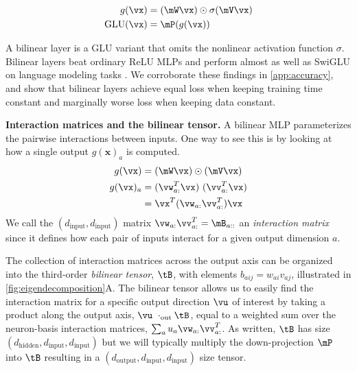 \documentclass{article} %
\begin{document}
\begin{equation}
\begin{aligned} \label{eq:glu}
    g(\vx)          &= (\mW\vx) \odot \sigma(\mV\vx)    \\
    \text{GLU}(\vx) &= \mP(g(\vx))                           
\end{aligned}
\end{equation}

A bilinear layer is a GLU variant that omits the nonlinear activation function $\sigma$. Bilinear layers beat ordinary ReLU MLPs and perform almost as well as SwiGLU on language modeling tasks \citep{shazeer2020glu}. We corroborate these findings in \autoref{app:accuracy}, and show that bilinear layers achieve equal loss when keeping training time constant and marginally worse loss when keeping data constant.

\textbf{Interaction matrices and the bilinear tensor.} A bilinear MLP parameterizes the pairwise interactions between inputs. One way to see this is by looking at how a single output $g(\textbf{x})_a$ is computed.
\begin{align} \label{eq:interaction}
g(\vx)       &= (\mW \vx) \odot (\mV \vx)                           \nonumber \\
g(\vx)_a     &= (\vw_{a:}^T\vx) \ (\vv^T_{a:}\vx)                 \nonumber \\
             &  = \vx^T (\vw_{a:} \vv_{a:}^T) \vx      \nonumber
\end{align}
We call the $(d_\text{input}, d_\text{input})$ matrix $\vw_{a:} \vv_{a:}^T = \mB_{a::}$ an \emph{interaction matrix} since it defines how each pair of inputs interact for a given output dimension $a$.

The collection of interaction matrices across the output axis can be organized into the third-order \emph{bilinear tensor}, $\tB$, with elements $b_{aij} = w_{ai} v_{aj}$, illustrated in \autoref{fig:eigendecomposition}A. The bilinear tensor allows us to easily find the interaction matrix for a specific output direction $\vu$ of interest by taking a product along the output axis, $\vu \ \cdot_\text{out} \tB$, equal to a weighted sum over the neuron-basis interaction matrices, $\sum_a u_a \vw_{a:} \vv_{a:}^T$. As written, $\tB$ has size $(d_\text{hidden}, d_\text{input}, d_\text{input})$ but we will typically multiply the down-projection $\mP$ into $\tB$ resulting in a $(d_\text{output}, d_\text{input}, d_\text{input})$ size tensor. 
\end{document}
